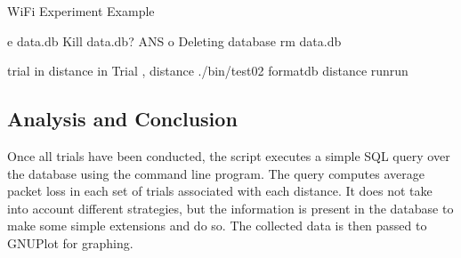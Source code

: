\documentclass[letterpaper,10pt,english]{sphinxmanual}
\begin{document}
\begin{sphinxVerbatim}[commandchars=\\\{\}]


 WiFi Experiment Example

 \PYG{o}{[} \PYGZhy{}e data.db \PYG{o}{]}
   Kill data.db?
   ANS
   \PYG{o}{[}    \PYGZhy{}o    \PYG{o}{]}
     Deleting database
    rm data.db

 trial in 
   distance in 
     Trial , distance 
    ./bin/test02 \PYGZhy{}\PYGZhy{}formatdb \PYGZhy{}\PYGZhy{}distance \PYGZhy{}\PYGZhy{}runrun\PYGZhy{}\PYGZhy{}
\end{sphinxVerbatim}


\subsection{Analysis and Conclusion}
\label{\detokenize{statistics:analysis-and-conclusion}}
Once all trials have been conducted, the script executes a simple SQL query over the database using the  command line program.  The query computes average packet loss in each set of trials associated with each distance.  It does not take into account different strategies, but the information is present in the database to make some simple extensions and do so.  The collected data is then passed to GNUPlot for graphing.
\end{document}

